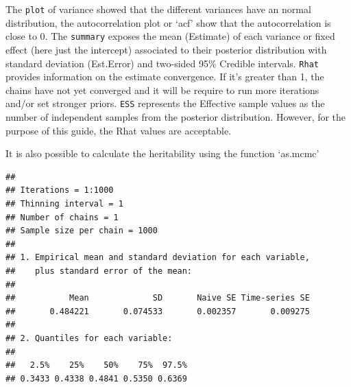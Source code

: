 \documentclass[
  12pt,
]{book}
\newenvironment{Shaded}{\begin{snugshade}}{\end{snugshade}}
\newcommand{\DataTypeTok}[1]{\textcolor[rgb]{0.13,0.29,0.53}{#1}}
\newcommand{\DecValTok}[1]{\textcolor[rgb]{0.00,0.00,0.81}{#1}}
\newcommand{\FloatTok}[1]{\textcolor[rgb]{0.00,0.00,0.81}{#1}}
\newcommand{\KeywordTok}[1]{\textcolor[rgb]{0.13,0.29,0.53}{\textbf{#1}}}
\newcommand{\NormalTok}[1]{#1}
\newcommand{\OperatorTok}[1]{\textcolor[rgb]{0.81,0.36,0.00}{\textbf{#1}}}
\newcommand{\OtherTok}[1]{\textcolor[rgb]{0.56,0.35,0.01}{#1}}
\newcommand{\StringTok}[1]{\textcolor[rgb]{0.31,0.60,0.02}{#1}}
\begin{document}
The \texttt{plot} of variance showed that the different variances have an normal distribution, the autocorrelation plot or `acf' show that the autocorrelation is close to 0.
The \texttt{summary} exposes the mean (Estimate) of each variance or fixed effect (here just the intercept) associated to their posterior distribution with standard deviation (Est.Error) and two-sided 95\% Credible intervals.
\texttt{Rhat} provides information on the estimate convergence. If it's greater than 1, the chains have not yet converged and it will be require to run more iterations and/or set stronger priors.
\texttt{ESS} represents the Effective sample values as the number of independent samples from the posterior distribution.
However, for the purpose of this guide, the Rhat values are acceptable.

It is also possible to calculate the heritability using the function `as.mcmc'

\begin{Shaded}
\end{Shaded}

\begin{verbatim}
## 
## Iterations = 1:1000
## Thinning interval = 1 
## Number of chains = 1 
## Sample size per chain = 1000 
## 
## 1. Empirical mean and standard deviation for each variable,
##    plus standard error of the mean:
## 
##           Mean             SD       Naive SE Time-series SE 
##       0.484221       0.074533       0.002357       0.009275 
## 
## 2. Quantiles for each variable:
## 
##   2.5%    25%    50%    75%  97.5% 
## 0.3433 0.4338 0.4841 0.5350 0.6369
\end{verbatim}
\end{document}
